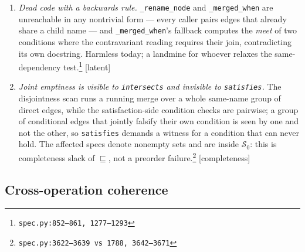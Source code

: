 \documentclass[11pt]{article}
\theoremstyle{definition}
\theoremstyle{remark}
\newcommand{\sat}{\sqsubseteq}
\newcommand{\Spec}{\mathcal{S}}
\newcommand{\code}[1]{\texttt{#1}}
\newcommand{\src}[1]{\footnote{\code{#1}}}
\begin{document}
\begin{enumerate}[itemsep=3pt]
\code{add\_dependency\_edge} neither canonicalizes conditions nor runs the
joint-emptiness scan, so it assembles a state that denotes $\emptyset$,
satisfies itself, and intersects nothing --- including the anonymous top ---
where the parser refuses the same spec.  Separately, the two-provider
refusal gates on object identity (\code{when is EMPTY\_SPEC}), so a
value-empty condition that is not the singleton bypasses
it.\src{spec.py:2256, 2368--2384}  [new bugs; the constructibility route
promised in \S\ref{sec:empty}]
\item \emph{Dead code with a backwards rule.}  \code{\_rename\_node} and
\code{\_merged\_when} are unreachable in any nontrivial form --- every
caller pairs edges that already share a child name --- and
\code{\_merged\_when}'s fallback computes the \emph{meet} of two conditions
where the contravariant reading requires their join, contradicting its own
docstring.  Harmless today; a landmine for whoever relaxes the
same-dependency test.\src{spec.py:852--861, 1277--1293}  [latent]
\item \emph{Joint emptiness is visible to \code{intersects} and invisible
to \code{satisfies}.}  The disjointness scan runs a running merge over a
whole same-name group of direct edges, while the satisfaction-side condition
checks are pairwise; a group of conditional edges that jointly falsify their
own condition is seen by one and not the other, so \code{satisfies} demands
a witness for a condition that can never hold.  The affected specs denote
nonempty sets and are inside $\Spec_0$: this is completeness slack of
$\sat$, not a preorder failure.\src{spec.py:3622--3639 vs 1788,
3642--3671}  [completeness]
\end{enumerate}

\subsection{Cross-operation coherence}\label{sec:audit-crossop}
\end{document}
